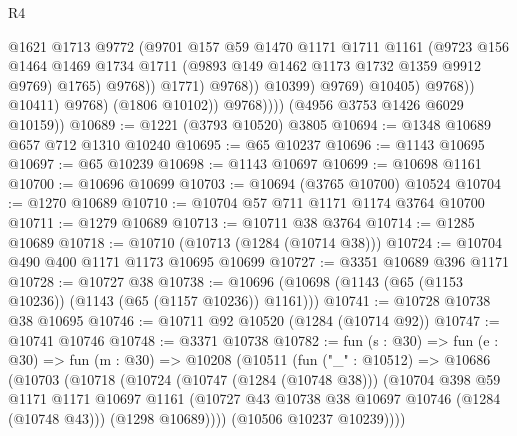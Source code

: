\begin{lexlean}{R4}
\begin{coremodule}
                                      @1621
                                      @1713
                                      @9772
                                      (@9701
                                        @157
                                        @59
                                        @1470
                                        @1171
                                        @1711
                                        @1161
                                        (@9723
                                          @156
                                          @1464
                                          @1469
                                          @1734
                                          @1711
                                          (@9893 @149 @1462 @1173 @1732 @1359 @9912 @9769)
                                          @1765)
                                        @9768))
                                    @1771)
                                  @9768))
                              @10399)
                            @9769)
                          @10405)
                        @9768))
                    @10411)
                  @9768)
                (@1806 @10102))
              @9768))))
      (@4956 @3753 @1426 @6029 @10159))
@10689 := @1221 (@3793 @10520) @3805
@10694 := @1348 @10689 @657 @712 @1310 @10240
@10695 := @65 @10237
@10696 := @1143 @10695
@10697 := @65 @10239
@10698 := @1143 @10697
@10699 := @10698 @1161
@10700 := @10696 @10699
@10703 := @10694 (@3765 @10700) @10524
@10704 := @1270 @10689
@10710 := @10704 @57 @711 @1171 @1174 @3764 @10700
@10711 := @1279 @10689
@10713 := @10711 @38 @3764
@10714 := @1285 @10689
@10718 := @10710 (@10713 (@1284 (@10714 @38)))
@10724 := @10704 @490 @400 @1171 @1173 @10695 @10699
@10727 := @3351 @10689 @396 @1171
@10728 := @10727 @38
@10738 := @10696 (@10698 (@1143 (@65 (@1153 @10236)) (@1143 (@65 (@1157 @10236)) @1161)))
@10741 := @10728 @10738 @38 @10695
@10746 := @10711 @92 @10520 (@1284 (@10714 @92))
@10747 := @10741 @10746
@10748 := @3371 @10738
@10782 := fun (s : @30) =>
  fun (e : @30) =>
  fun (m : @30) =>
  @10208
    (@10511
      (fun ("_" : @10512) =>
      @10686
        (@10703
          (@10718
            (@10724
              (@10747 (@1284 (@10748 @38)))
              (@10704
                @398
                @59
                @1171
                @1171
                @10697
                @1161
                (@10727 @43 @10738 @38 @10697 @10746 (@1284 (@10748 @43)))
                (@1298 @10689))))
          (@10506 @10237 @10239))))

\end{coremodule}
\end{lexlean}
